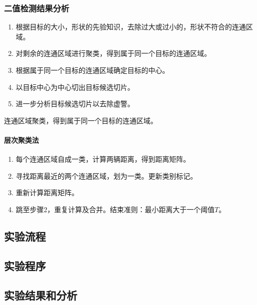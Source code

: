 \subsubsection{二值检测结果分析}
\begin{enumerate}
	\item 根据目标的大小，形状的先验知识，去除过大或过小的，形状不符合的连通区域。
	\item 对剩余的连通区域进行聚类，得到属于同一个目标的连通区域。
	\item 根据属于同一个目标的连通区域确定目标的中心。
	\item 以目标中心为中心切出目标候选切片。
	\item 进一步分析目标候选切片以去除虚警。
\end{enumerate}
连通区域聚类，得到属于同一个目标的连通区域。
\paragraph{层次聚类法}
\begin{enumerate}
	\item 每个连通区域自成一类，计算两辆距离，得到距离矩阵。
	\item 寻找距离最近的两个连通区域，划为一类。更新类别标记。
	\item 重新计算距离矩阵。
	\item 跳至步骤2，重复计算及合并。结束准则：最小距离大于一个阈值$T$。
\end{enumerate}
\subsection{实验流程}
\subsection{实验程序}
\subsection{实验结果和分析}